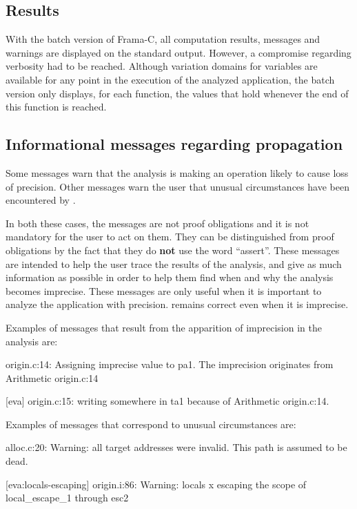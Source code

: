 \documentclass{frama-c-book}
\begin{document}
\subsection{Results}

With the batch version of Frama-C, all computation results,
messages and warnings are displayed on the standard output.
However, a compromise regarding verbosity had to
be reached. Although variation domains for variables
are available for any point in the execution of the analyzed application,
the batch version only displays, for each function, the values that
hold whenever the end of this function is reached.



\subsection{Informational messages regarding propagation}

Some messages warn that the analysis is making an operation likely
to cause loss of precision. Other messages warn the user that
unusual circumstances have been encountered by \Eva{}.

In both these cases, the messages are not proof
obligations and it is not mandatory for the user to act on them.
They can be distinguished from proof obligations by the fact that
they do {\bf not} use the word ``assert''.
These messages
are intended to help the user trace the results of the analysis, and
give as much information as possible in order to help
them find when and why the analysis becomes imprecise.
These messages are only useful when it is important to analyze the application
with precision. \Eva{} remains correct even when it
is imprecise.
\smallskip

Examples of messages that result from the apparition of imprecision in the
analysis are:
\begin{logsmath}
[eva] origin.c:14:
  Assigning imprecise value to pa1.
  The imprecision originates from Arithmetic {origin.c:14}

[eva] origin.c:15:
  writing somewhere in {ta1} because of Arithmetic {origin.c:14}.
\end{logsmath}

Examples of messages that correspond to unusual circumstances are:
\begin{logsmath}
[kernel] alloc.c:20: Warning:
  all target addresses were invalid. This path is assumed to be dead.

[eva:locals-escaping] origin.i:86: Warning:
  locals {x} escaping the scope of local_escape_1 through esc2
\end{logsmath}
\end{document}
